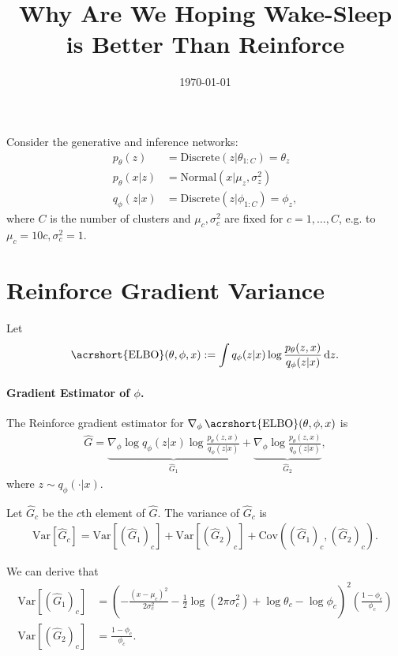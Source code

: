 \documentclass[a4paper]{article}
\title{Why Are We Hoping Wake-Sleep is Better Than Reinforce}
\author{}
\date{\today}
\DeclareMathOperator{\1}{{}\mathds{1}}
\DeclareMathOperator{\ELBO}{\acrshort{ELBO}}
\newcommand{\given}{\lvert}
\begin{document}
\maketitle

Consider the generative and inference networks:
\begin{align}
  p_\theta(z) &= \mathrm{Discrete}(z \given \theta_{1:C}) = \theta_z \\
  p_\theta(x \given z) &= \mathrm{Normal}(x \given \mu_z, \sigma_z^2) \\
  q_\phi(z \given x) &= \mathrm{Discrete}(z \given \phi_{1:C}) = \phi_z,
\end{align}
where $C$ is the number of clusters and $\mu_c, \sigma_c^2$ are fixed for $c = 1, \dotsc, C$, e.g. to $\mu_c = 10c, \sigma_c^2 = 1$.

\section{Reinforce Gradient Variance}
Let
\begin{align}
  \ELBO(\theta, \phi, x) := \int q_\phi(z \given x) \log \frac{p_\theta(z, x)}{q_\phi(z \given x)} \,\mathrm dz.
\end{align}

\paragraph{Gradient Estimator of $\phi$.}
The Reinforce gradient estimator for $\nabla_\phi \ELBO(\theta, \phi, x)$ is
\begin{align}
  \hat G = \underbrace{\nabla_\phi \log q_\phi(z \given x) \log \frac{p_\theta(z, x)}{q_\phi(z \given x)}}_{\hat G_1} + \underbrace{\nabla_\phi \log \frac{p_\theta(z, x)}{q_\phi(z \given x)}}_{\hat G_2},
\end{align}
where $z \sim q_\phi(\cdot \given x)$.

Let $\hat G_c$ be the $c$th element of $\hat G$. The variance of $\hat G_c$ is
\begin{align}
  \mathrm{Var}[\hat G_c] = \mathrm{Var}[(\hat G_1)_c] + \mathrm{Var}[(\hat G_2)_c] + \mathrm{Cov}((\hat G_1)_c, (\hat G_2)_c).
\end{align}

We can derive that
\begin{align}
  \mathrm{Var}[(\hat G_1)_c] &= \left(-\frac{(x - \mu_c)^2}{2 \sigma_c^2} - \frac{1}{2} \log(2 \pi \sigma_c^2) + \log \theta_c - \log \phi_c \right)^2 \left(\frac{1 - \phi_c}{\phi_c}\right)\\
  \mathrm{Var}[(\hat G_2)_c] &= \frac{1 - \phi_c}{\phi_c}.
\end{align}
\end{document}
